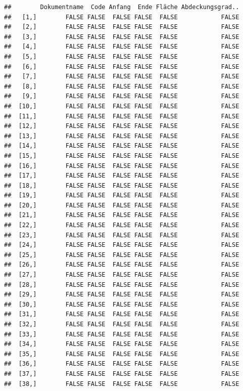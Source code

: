 \documentclass[
  english,
  man,floatsintext]{apa6}
\begin{document}
\begin{verbatim}
##        Dokumentname  Code Anfang  Ende Fläche Abdeckungsgrad..
##   [1,]        FALSE FALSE  FALSE FALSE  FALSE            FALSE
##   [2,]        FALSE FALSE  FALSE FALSE  FALSE            FALSE
##   [3,]        FALSE FALSE  FALSE FALSE  FALSE            FALSE
##   [4,]        FALSE FALSE  FALSE FALSE  FALSE            FALSE
##   [5,]        FALSE FALSE  FALSE FALSE  FALSE            FALSE
##   [6,]        FALSE FALSE  FALSE FALSE  FALSE            FALSE
##   [7,]        FALSE FALSE  FALSE FALSE  FALSE            FALSE
##   [8,]        FALSE FALSE  FALSE FALSE  FALSE            FALSE
##   [9,]        FALSE FALSE  FALSE FALSE  FALSE            FALSE
##  [10,]        FALSE FALSE  FALSE FALSE  FALSE            FALSE
##  [11,]        FALSE FALSE  FALSE FALSE  FALSE            FALSE
##  [12,]        FALSE FALSE  FALSE FALSE  FALSE            FALSE
##  [13,]        FALSE FALSE  FALSE FALSE  FALSE            FALSE
##  [14,]        FALSE FALSE  FALSE FALSE  FALSE            FALSE
##  [15,]        FALSE FALSE  FALSE FALSE  FALSE            FALSE
##  [16,]        FALSE FALSE  FALSE FALSE  FALSE            FALSE
##  [17,]        FALSE FALSE  FALSE FALSE  FALSE            FALSE
##  [18,]        FALSE FALSE  FALSE FALSE  FALSE            FALSE
##  [19,]        FALSE FALSE  FALSE FALSE  FALSE            FALSE
##  [20,]        FALSE FALSE  FALSE FALSE  FALSE            FALSE
##  [21,]        FALSE FALSE  FALSE FALSE  FALSE            FALSE
##  [22,]        FALSE FALSE  FALSE FALSE  FALSE            FALSE
##  [23,]        FALSE FALSE  FALSE FALSE  FALSE            FALSE
##  [24,]        FALSE FALSE  FALSE FALSE  FALSE            FALSE
##  [25,]        FALSE FALSE  FALSE FALSE  FALSE            FALSE
##  [26,]        FALSE FALSE  FALSE FALSE  FALSE            FALSE
##  [27,]        FALSE FALSE  FALSE FALSE  FALSE            FALSE
##  [28,]        FALSE FALSE  FALSE FALSE  FALSE            FALSE
##  [29,]        FALSE FALSE  FALSE FALSE  FALSE            FALSE
##  [30,]        FALSE FALSE  FALSE FALSE  FALSE            FALSE
##  [31,]        FALSE FALSE  FALSE FALSE  FALSE            FALSE
##  [32,]        FALSE FALSE  FALSE FALSE  FALSE            FALSE
##  [33,]        FALSE FALSE  FALSE FALSE  FALSE            FALSE
##  [34,]        FALSE FALSE  FALSE FALSE  FALSE            FALSE
##  [35,]        FALSE FALSE  FALSE FALSE  FALSE            FALSE
##  [36,]        FALSE FALSE  FALSE FALSE  FALSE            FALSE
##  [37,]        FALSE FALSE  FALSE FALSE  FALSE            FALSE
##  [38,]        FALSE FALSE  FALSE FALSE  FALSE            FALSE

\end{verbatim}
\end{document}
